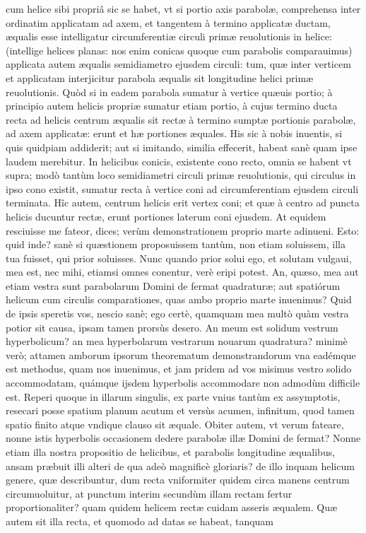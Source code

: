 \documentclass[11pt,a4paper]{article}
\begin{document}
cum helice sibi propriâ sic se habet, vt si portio axis parabolæ, comprehensa inter ordinatim applicatam ad axem, et tangentem à termino applicatæ ductam, æqualis esse intelligatur circumferentiæ circuli primæ reuolutionis in helice: (intellige helices planas: nos enim conicas quoque cum parabolis comparauimus) applicata autem æqualis semidiametro ejusdem circuli: tum, quæ inter verticem et applicatam interjicitur parabola æqualis sit longitudine helici primæ reuolutionis. Quòd si in eadem parabola sumatur à vertice quæuis portio; à principio autem helicis propriæ sumatur etiam portio, à cujus termino ducta recta ad helicis centrum æqualis sit rectæ à termino sumptæ portionis parabolæ, ad axem applicatæ: erunt et hæ portiones æquales. His sic à nobis inuentis, si quis quidpiam addiderit; aut si imitando, similia effecerit, habeat sanè quam ipse laudem merebitur. In helicibus conicis, existente cono recto, omnia se habent vt supra; modò tantùm loco semidiametri circuli primæ reuolutionis, qui circulus in ipso cono existit, sumatur recta à vertice coni ad circumferentiam ejusdem circuli terminata. Hîc autem, centrum helicis erit vertex coni; et quæ à centro ad puncta helicis ducuntur rectæ, erunt portiones laterum coni ejusdem. At equidem resciuisse me fateor, dices; verùm demonstrationem proprio marte adinueni. Esto: quid inde? sanè si quæstionem proposuissem tantùm, non etiam soluissem, illa tua fuisset, qui prior soluisses. Nunc quando prior solui ego, et solutam vulgaui, mea est, nec mihi, etiamsi omnes conentur, verè eripi potest. An, quæso, mea aut etiam vestra sunt parabolarum Domini de fermat quadraturæ; aut spatiórum helicum cum circulis comparationes, quas ambo proprio marte inuenimus? Quid de ipsis speretis vos, nescio sanè; ego certè, quamquam mea multò quàm vestra potior sit causa, ipsam tamen prorsùs desero. An meum est solidum vestrum hyperbolicum? an mea hyperbolarum vestrarum nouarum quadratura? minimè verò; attamen amborum ipsorum theorematum demonstrandorum vna eadémque est methodus, quam nos inuenimus, et jam pridem ad vos misimus vestro solido accommodatam, quámque ijsdem hyperbolis accommodare non admodùm difficile est. Reperi quoque in illarum singulis, ex parte vnius tantùm ex assymptotis, resecari posse spatium planum acutum et versùs acumen, infinitum, quod tamen spatio finito atque vndique clauso sit æquale. Obiter autem, vt verum fateare, nonne istis hyperbolis occasionem dedere parabolæ illæ Domini de fermat? Nonne etiam illa nostra propositio de helicibus, et parabolis longitudine æqualibus, ansam præbuit illi alteri de qua adeò magnificè gloriaris? de illo inquam helicum genere, quæ describuntur, dum recta vniformiter quidem circa manens centrum circumuoluitur, at punctum interim secundùm illam rectam fertur proportionaliter? quam quidem helicem rectæ cuidam asseris æqualem. Quæ autem sit illa recta, et quomodo ad datas se habeat, tanquam
\end{document}
